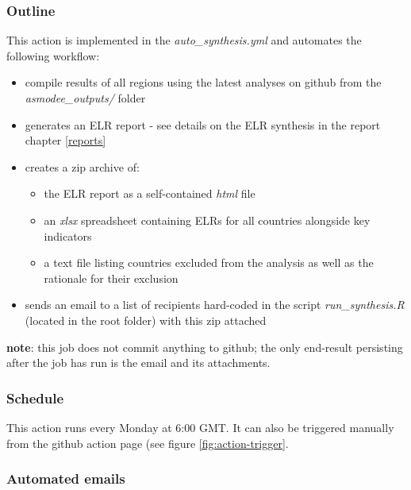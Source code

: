\documentclass[]{book}
\providecommand{\tightlist}{%
  \setlength{\itemsep}{0pt}\setlength{\parskip}{0pt}}
\begin{document}
\hypertarget{outline-2}{%
\subsubsection{Outline}\label{outline-2}}

This action is implemented in the \emph{auto\_synthesis.yml} and automates the following
workflow:

\begin{itemize}
\tightlist
\item
  compile results of all regions using the latest analyses on github from the
  \emph{asmodee\_outputs/} folder
\item
  generates an ELR report - see details on the ELR synthesis in the report
  chapter \ref{reports}
\item
  creates a zip archive of:

  \begin{itemize}
  \tightlist
  \item
    the ELR report as a self-contained \emph{html} file
  \item
    an \emph{xlsx} spreadsheet containing ELRs for all countries alongside key indicators
  \item
    a text file listing countries excluded from the analysis as well as the
    rationale for their exclusion
  \end{itemize}
\item
  sends an email to a list of recipients hard-coded in the script
  \emph{run\_synthesis.R} (located in the root folder) with this zip attached
\end{itemize}

\textbf{note}: this job does not commit anything to github; the only end-result
persisting after the job has run is the email and its attachments.

\hypertarget{schedule-2}{%
\subsubsection{Schedule}\label{schedule-2}}

This action runs every Monday at 6:00 GMT. It can also be triggered
manually from the github action page (see figure \ref{fig:action-trigger}.

\hypertarget{automated-emails}{%
\subsubsection{Automated emails}\label{automated-emails}}
\end{document}
